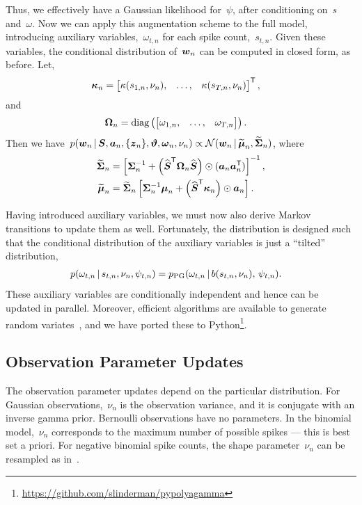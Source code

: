 Thus, we effectively have a Gaussian likelihood for~$\psi$, after conditioning 
on~$s$ and~$\omega$. Now we can apply this augmentation scheme to the full
model, introducing auxiliary variables,~$\omega_{t,n}$ for each spike count,~$s_{t,n}$.
Given these variables, the conditional distribution of~$\boldsymbol{w}_n$ can be computed in closed form,
as before. Let,
\begin{align*}
  \boldsymbol{\kappa}_n
  &= \begin{bmatrix} \kappa(s_{1,n}, \nu_n), &\ldots, &\kappa(s_{T,n}, \nu_n)
  \end{bmatrix}^{\mathsf{T}},
\end{align*}
and
\begin{align*}
  \boldsymbol{\Omega}_n &= \mathrm{diag} \left(
  \begin{bmatrix}
    \omega_{1,n}, & \ldots, & \omega_{T,n}
  \end{bmatrix}
  \right).
\end{align*}
Then we have~$
  p(\boldsymbol{w}_n \,|\, \boldsymbol{S}, \boldsymbol{a}_n, \{\boldsymbol{z}_n\}, \boldsymbol{\vartheta}, \boldsymbol{\omega}_n, \nu_n)
  \propto \mathcal{N}(\boldsymbol{w}_n \,|\, \widetilde{\boldsymbol{\mu}}_n, \widetilde{\boldsymbol{\Sigma}}_n)$,
where
\begin{align*}
  \widetilde{\boldsymbol{\Sigma}}_n &= \left[ \boldsymbol{\Sigma}_n^{-1} +
  \left(\widehat{\boldsymbol{S}}^{\mathsf{T}} \boldsymbol{\Omega}_n \widehat{\boldsymbol{S}} \right) \odot (\boldsymbol{a}_n \boldsymbol{a}_n^{\mathsf{T}}) \right]^{-1}, \\
  \widetilde{\boldsymbol{\mu}}_n &= \widetilde{\boldsymbol{\Sigma}}_n \left[ \boldsymbol{\Sigma}_n^{-1} \boldsymbol{\mu}_n +
  \left(\widehat{\boldsymbol{S}}^{\mathsf{T}} \boldsymbol{\kappa}_n \right) \odot \boldsymbol{a}_n \right].
\end{align*}

Having introduced auxiliary variables, we must now also derive
Markov transitions to update them as well. Fortunately, the
\polyagamma distribution is designed such that the conditional
distribution of the auxiliary variables is just a ``tilted'' \polyagamma
distribution,
\begin{align}
  p(\omega_{t,n} \,|\, s_{t,n}, \nu_n, \psi_{t,n})
  &= p_{\mathrm{PG}}(\omega_{t,n} \,|\, b(s_{t,n}, \nu_n), \, \psi_{t,n}).
\end{align}
These auxiliary variables are conditionally independent and hence can
be updated in parallel. Moreover, efficient algorithms are available
to generate \polyagamma random variates~\cite{windle2014sampling}, and
we have ported these to Python\footnote{\url{https://github.com/slinderman/pypolyagamma}}.

\subsection{Observation Parameter Updates}
The observation parameter updates depend on the particular distribution.
For Gaussian observations,~$\nu_n$ is the observation variance, and
it is conjugate with an inverse gamma prior.
Bernoulli observations have no parameters.
In the binomial model,~$\nu_n$ corresponds to the maximum number of
possible spikes --- this is best set a priori.
For negative binomial spike counts, the shape parameter~$\nu_n$ can
be resampled as in~\cite{Zhou2012}.


